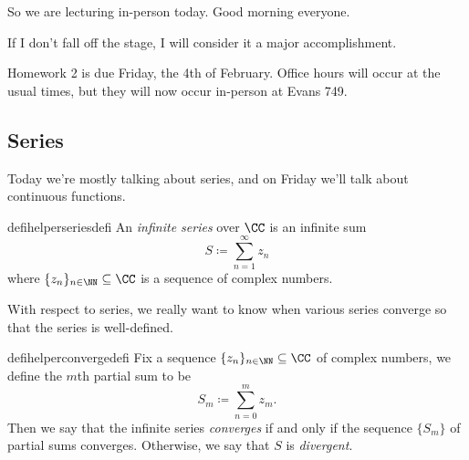 \documentclass[../notes.tex]{subfiles}
\begin{document}

So we are lecturing in-person today. Good morning everyone.
\begin{quot}
	If I don't fall off the stage, I will consider it a major accomplishment.
\end{quot}
Homework 2 is due Friday, the 4th of February. Office hours will occur at the usual times, but they will now occur in-person at Evans 749.

\subsection{Series}
Today we're mostly talking about series, and on Friday we'll talk about continuous functions.
\begin{restatable}[Series]{defihelper}{seriesdefi} 
	An \textit{infinite series} over $\CC$ is an infinite sum
	\[S\coloneqq\sum_{n=1}^\infty z_n\]
	where $\{z_n\}_{n\in\NN}\subseteq\CC$ is a sequence of complex numbers.
\end{restatable}
\noindent With respect to series, we really want to know when various series converge so that the series is well-defined.
\begin{restatable}{defihelper}{convergedefi} 
	Fix a sequence $\{z_n\}_{n\in\NN}\subseteq\CC$ of complex numbers, we define the $m$th partial sum to be
	\[S_m\coloneqq\sum_{n=0}^mz_m.\]
	Then we say that the infinite series \textit{converges} if and only if the sequence $\{S_m\}$ of partial sums converges. Otherwise, we say that $S$ is \textit{divergent}.
\end{restatable}
\end{document}
